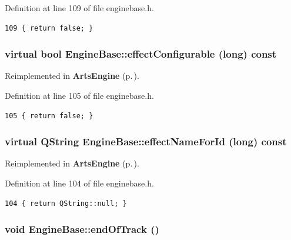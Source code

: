 Definition at line 109 of file enginebase.h.



\footnotesize\begin{verbatim}109 { return false; }
\end{verbatim}\normalsize 
{}
\subsubsection{\setlength{\rightskip}{0pt plus 5cm}virtual bool Engine\-Base::effect\-Configurable (long) const\hspace{0.3cm}{\tt  [inline, virtual]}}\label{classEngineBase_EngineBasea19}




Reimplemented in {\bf Arts\-Engine} {\rm (p.\,\pageref{classArtsEngine_ArtsEnginea13})}.

Definition at line 105 of file enginebase.h.



\footnotesize\begin{verbatim}105 { return false; }
\end{verbatim}\normalsize 
{}
\subsubsection{\setlength{\rightskip}{0pt plus 5cm}virtual QString Engine\-Base::effect\-Name\-For\-Id (long) const\hspace{0.3cm}{\tt  [inline, virtual]}}\label{classEngineBase_EngineBasea18}




Reimplemented in {\bf Arts\-Engine} {\rm (p.\,\pageref{classArtsEngine_ArtsEnginea12})}.

Definition at line 104 of file enginebase.h.



\footnotesize\begin{verbatim}104 { return QString::null; }
\end{verbatim}\normalsize 
{}
\subsubsection{\setlength{\rightskip}{0pt plus 5cm}void Engine\-Base::end\-Of\-Track ()\hspace{0.3cm}{\tt  [signal]}}\label{classEngineBase_EngineBasel0}




